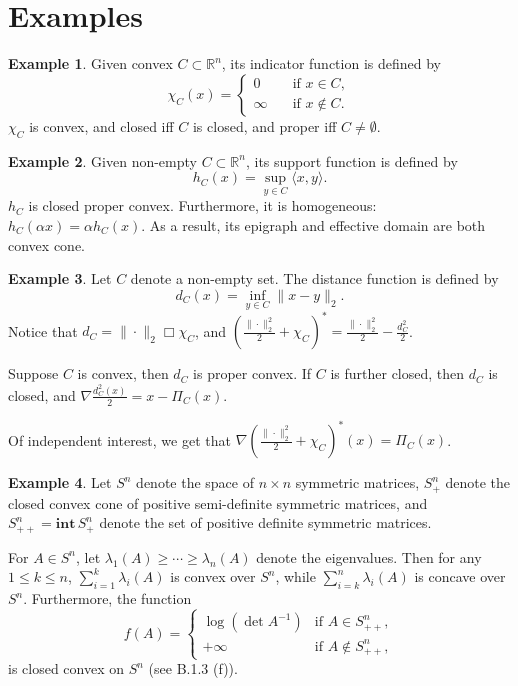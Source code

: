 \documentclass[openany]{book}
\theoremstyle{definition}
\newtheorem{example}{Example}[chapter]
\theoremstyle{remark}
\begin{document}
\section{Examples}
\begin{example}\label{indFE}
Given convex $C\subset \mathbb{R}^n$, its indicator function is defined by
\begin{equation}\label{indF}
\chi_C(x)=\left\{
\begin{array}{ll}
0 & \quad\textrm{if }x\in C, \\
\infty & \quad\textrm{if }x\not\in C.
\end{array}
\right.
\end{equation}
$\chi_C$ is convex, and closed iff $C$ is closed, and proper iff $C\ne\emptyset$.
\end{example}
\begin{example}
    Given non-empty $C\subset \mathbb{R}^n$, its support function is defined by
    \begin{equation}
        h_C(x)=\sup_{y\in C}\langle x,y\rangle.
    \end{equation}
    $h_C$ is closed proper convex. Furthermore, it is homogeneous: $h_C(\alpha x)=\alpha h_C(x)$. As a result, its epigraph and effective domain are both convex cone.
\end{example}
\begin{example}\label{e.g.:constrQuad}
    Let $C$ denote a non-empty set. The distance function is defined by
    \begin{equation}
        d_C(x)=\inf_{y\in C}\|x-y\|_2.
    \end{equation}
    Notice that $d_C=\|\cdot\|_2\Box\chi_C$, and $\left(\frac{\|\cdot\|_2^2}{2}+\chi_C\right)^*=\frac{\|\cdot\|_2^2}{2}-\frac{d_C^2}{2}$.

    Suppose $C$ is convex, then $d_C$ is proper convex. If $C$ is further closed, then $d_C$ is closed, and $\nabla \frac{d_C^2(x)}{2}=x-\Pi_C(x)$.

    Of independent interest, we get that $\nabla\left(\frac{\|\cdot\|_2^2}{2}+\chi_C\right)^*(x)=\Pi_C(x)$.
\end{example}
\begin{example}
    Let $S^n$ denote the space of $n\times n$ symmetric matrices, $S_+^n$ denote the closed convex cone of positive semi-definite symmetric matrices, and $S_{++}^n=\mathbf{int}\,S_+^n$ denote the set of positive definite symmetric matrices.

    For $A\in S^n$, let $\lambda_1(A)\ge\cdots\ge\lambda_n(A)$ denote the eigenvalues. Then for any $1\le k\le n$, $\sum_{i=1}^{k}\lambda_i(A)$ is convex over $S^n$, while $\sum_{i=k}^{n}\lambda_i(A)$ is concave over $S^n$. Furthermore, the function
    \begin{equation}
        f(A)=\left\{
        \begin{array}{ll}
            \log(\det A^{-1}) & \textrm{if }A\in S_{++}^n, \\
            +\infty & \textrm{if }A\not\in S_{++}^n,
        \end{array}
        \right.
    \end{equation}
    is closed convex on $S^n$ (see \cite{HL12} B.1.3 (f)).
\end{example}
\end{document}
